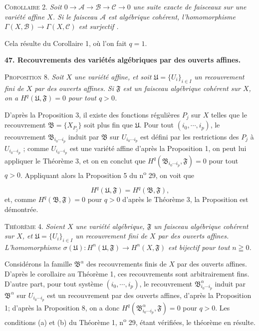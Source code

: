 \textsc{Corollaire} 2. \textit{Soit $0 \to \mathcal{A} \to \mathcal{B} \to \mathcal{C} \to 0$ une suite exacte de faisceaux sur une variété affine $X$. Si le faisceau $\mathcal{A}$ est algébrique cohérent, l'homomorphisme $\Gamma(X, \mathcal{B}) \to \Gamma(X, \mathcal{C})$ est surjectif .}

Cela résulte du Corollaire 1, où l'on fait $q = 1$.


\textbf{47. Recouvrements des variétés algébriques par des ouverts affines.}

\textsc{Proposition} 8. \textit{Soit $X$ une variété affine, et soit $\mathfrak{U} = \{U_i\}_{i \in I}$ un recouvrement fini de $X$ par des ouverts affines. Si $\mathfrak{F}$ est un faisceau algébrique cohérent sur $X$, on a $H^q(\mathfrak{U}, \mathfrak{F}) = 0$ pour tout $q > 0$.}

D'après la Proposition 3, il existe des fonctions régulières $P_j$ sur $X$ telles que le recouvrement $\mathfrak{B} = \{X_{P_j}\}$ soit plus fin que $\mathfrak{U}$. Pour tout $(i_0 , \cdots , i_p)$, le recouvrement $\mathfrak{B}_{i_0 \cdots i_p}$ induit par $\mathfrak{B}$ sur $U_{i_0 \cdots i_p}$ est défini par les restrictions des $P_j$ à $U_{i_0 \cdots i_p}$ ; comme $U_{i_0 \cdots i_p}$ est une variété affine d'après la Proposition 1, on peut lui appliquer le Théorème 3, et on en conclut que $H^q(\mathfrak{B}_{i_0 \cdots i_p} , \mathfrak{F}) = 0$ pour tout $q > 0$. Appliquant alors la Proposition 5 du n\textsuperscript{o} 29, on voit que

\begin{equation*}
H^q(\mathfrak{U}, \mathfrak{F}) = H^q(\mathfrak{B}, \mathfrak{F}),
\end{equation*}
et, comme $H^q(\mathfrak{B}, \mathfrak{F}) = 0$ pour $q > 0$ d'après le Théorème 3, la Proposition est démontrée.

\textsc{Théorème} 4. \textit{Soient $X$ une variété algébrique, $\mathfrak{F}$ un faisceau algébrique cohérent sur $X$, et $\mathfrak{U} = \{U_i\}_{i \in I}$ un recouvrement fini de $X$ par des ouverts affines. L'homomorphisme $\sigma(\mathfrak{U}) : H^n(\mathfrak{U}, \mathfrak{F}) \to H^n(X, \mathfrak{F})$ est bijectif pour tout $n \geqq 0$.}

Considérons la famille $\mathfrak{B}^\alpha$ des recouvrements finis de $X$ par des ouverts affines. D'après le corollaire au Théorème 1, ces recouvrements sont arbitrairement fins. D'autre part, pour tout système $(i_0 , \cdots , i_p)$, le recouvrement $\mathfrak{B}^\alpha_{i_0 \cdots i_p}$ induit par $\mathfrak{B}^\alpha$ sur $U_{i_0 \cdots i_p}$ est un recouvrement par des ouverts affines, d'après la Proposition 1; d'après la Proposition 8, on a donc $H^q(\mathfrak{B}^\alpha_{i_0 \cdots i_p} , \mathfrak{F}) = 0$ pour $q > 0$. Les conditions (a) et (b) du Théorème 1, n\textsuperscript{o} 29, étant vérifiées, le théorème en résulte.

